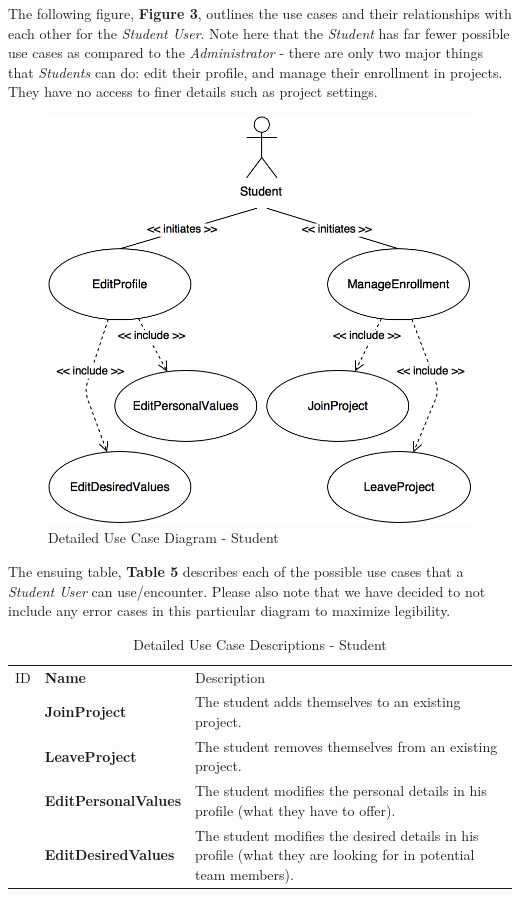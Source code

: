 \documentclass[12pt,letterpaper]{article}
\begin{document}
The following figure, {\bf Figure 3}, outlines the use cases and their relationships with each other for the {\it Student User}. Note here that the {\it Student} has far fewer possible use cases
as compared to the {\it Administrator} - there are only two major things that {\it Students} can do: edit their profile, and manage their enrollment in projects. They have no 
access to finer details such as project settings. 

\begin{figure}[H]
	\centering{}
	\includegraphics[scale=0.25]{imgs/detailed-student-use-case-diagram.png}
	\caption{Detailed Use Case Diagram - Student}
\end{figure}

\newpage{}

The ensuing table, {\bf Table 5} describes each of the possible use cases that a {\it Student User} can use/encounter.
Please also note that we have decided to not include any error cases in this particular diagram to maximize legibility.

\begin{table}[H]
	\caption{Detailed Use Case Descriptions - Student}
	\begin{tabu} to 
	    \tableheader{}ID & Name & Description\\
		\joinproject{} & JoinProject & The student adds themselves to an existing project.\\
		\leaveproject{} & LeaveProject & The student removes themselves from an existing project.\\
		\editpersonalvalues{} & EditPersonalValues & The student modifies the personal details in his profile (what they have to offer).\\
		\editdesiredvalues{} & EditDesiredValues & The student modifies the desired details in his profile (what they are looking for in potential team members).\\
	\end{tabu}
\end{table}
\end{document}
